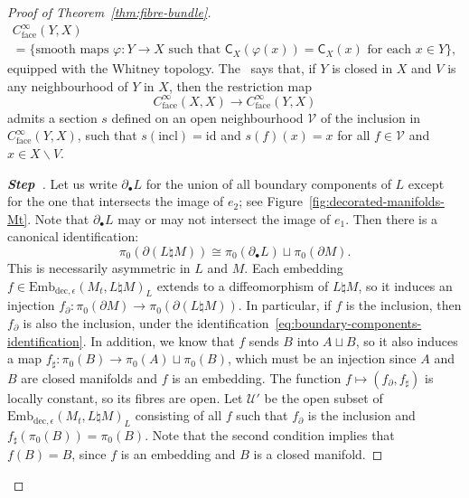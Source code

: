 \documentclass[AHL,Unicode,published]{cedram}
\newcommand{\id}{\mathrm{id}}
\newcommand{\rincl}{\mathrm{incl}}
\newcommand{\rdec}{\mathrm{dec}}
\newcommand{\rface}{\mathrm{face}}
\newcommand{\sC}{\mathsf{C}}
\newcommand{\cU}{\mathcal{U}}
\newcommand{\cV}{\mathcal{V}}
\newcommand{\too}{\ensuremath{\longrightarrow}}
\newcommand{\embdece}{\ensuremath{\mathrm{Emb}_{\rdec,\epsilon}}}
\newcounter{stepcount}
\newenvironment{step}[1]{\refstepcounter{stepcount}\begin{proof}
[\textbf{Step~\thestepcount}]}{\let\qed\relax\end{proof}}
\begin{document}
\begin{proof}[Proof of Theorem~\ref{thm:fibre-bundle}]
\begin{multline*}
C^{\infty}_{\rface}(Y,X)\\
= \{ \text{smooth maps } \varphi \colon Y \to X \text{ such that } \sC_{X}(\varphi(x)) = \sC_{X}(x) \text{ for each } x \in Y \},
\end{multline*}
equipped with the Whitney topology. The~\cite[\emph{Extension Lemma} II.2.1.2]{Cerf1961Topologiedecertains} says that, if $Y$ is closed in $X$ and $V$ is any neighbourhood of $Y$ in $X$, then the restriction map
\[
C^{\infty}_{\rface}(X,X) \too C^{\infty}_{\rface}(Y,X)
\]
admits a section $s$ defined on an open neighbourhood $\cV$ of the inclusion in $C^{\infty}_{\rface}(Y,X)$, such that $s(\rincl) = \id$ and $s(f)(x) = x$ for all $f \in \cV$ and $x \in X \smallsetminus V$.


\begin{step}{{}}
Let us write $\partial_\bullet L$ for the union of all boundary components of $L$ except for the one that intersects the image of $e_{2}$; see Figure~\ref{fig:decorated-manifolds-Mt}. Note that $\partial_\bullet L$ may or may not intersect the image of $e_{1}$. Then there is a canonical identification:
\begin{equation}\label{eq:boundary-components-identification}
\pi_{0}(\partial(L\natural M)) \cong \pi_{0}(\partial_\bullet L) \sqcup \pi_{0}(\partial M).
\end{equation}
This is necessarily asymmetric in $L$ and $M$. Each embedding $f \in \embdece(M_t,L\natural M)_L$ extends to a diffeomorphism of $L \natural M$, so it induces an injection $f_\partial \colon \pi_{0}(\partial M) \to \pi_{0}(\partial (L\natural M))$. In particular, if $f$ is the inclusion, then $f_\partial$ is also the inclusion, under the identification~\eqref{eq:boundary-components-identification}. In addition, we know that $f$ sends $B$ into $A \sqcup B$, so it also induces a map $f_\sharp \colon \pi_{0}(B) \to \pi_{0}(A) \sqcup \pi_{0}(B)$, which must be an injection since $A$ and $B$ are closed manifolds and $f$ is an embedding. The function $f \mapsto (f_\partial,f_\sharp)$ is locally constant, so its fibres are open. Let $\cU'$ be the open subset of $\embdece(M_t,L\natural M)_L$ consisting of all $f$ such that $f_\partial$ is the inclusion and $f_\sharp(\pi_{0}(B)) = \pi_{0}(B)$. Note that the second condition implies that $f(B) = B$, since $f$ is an embedding and $B$ is a closed manifold.
\end{step}


\end{proof}
\end{document}
